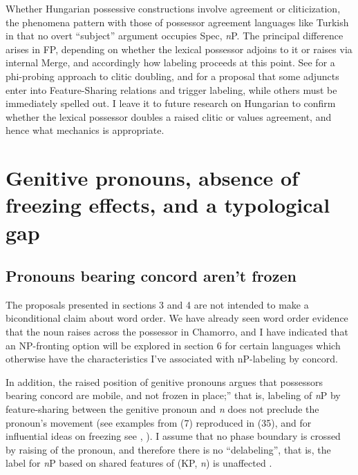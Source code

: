 \documentclass[output=paper
,modfonts
,nonflat]{langsci/langscibook}
\begin{document}
Whether Hungarian possessive constructions involve agreement or cliticization, the phenomena pattern with those of possessor agreement languages like Turkish in that no overt “subject” argument occupies Spec, \textit{n}P. The principal difference arises in FP, depending on whether the lexical possessor adjoins to it or raises via internal Merge, and accordingly how labeling proceeds at this point. See \citet{Preminger2015} for a phi-probing approach to clitic doubling, and \citet{Oseki2014} for a proposal that some adjuncts enter into Feature-Sharing relations and trigger labeling, while others must be immediately spelled out. I leave it to future research on Hungarian to confirm whether the lexical possessor doubles a raised clitic or values agreement, and hence what mechanics is appropriate.

\section{Genitive pronouns, absence of freezing effects, and a typological gap}

\subsection{Pronouns bearing concord aren't frozen}
The proposals presented in sections 3 and 4 are not intended to make a biconditional claim about word order. We have already seen word order evidence that the noun raises across the possessor in Chamorro, and I have indicated that an NP-fronting option will be explored in section 6 for certain languages which otherwise have the characteristics I’ve associated with nP-labeling by concord. 

In addition, the raised position of genitive pronouns argues that possessors bearing concord are mobile, and not {\textquotedbl}frozen in place;” that is, labeling of \textit{n}P by feature-sharing between the genitive pronoun and \textit{n} does not preclude the pronoun’s movement (see examples from (7) reproduced in (35), and for influential ideas on freezing see \citealt{Rizzi2006}, \citealt{Rizzi_Shlonsky2007}). I assume that no phase boundary is crossed by raising of the pronoun, and therefore there is no “delabeling”, that is, the label for \textit{n}P based on shared features of (KP, \textit{n}) is unaffected \citep[11]{Chomsky2015}.
\end{document}
